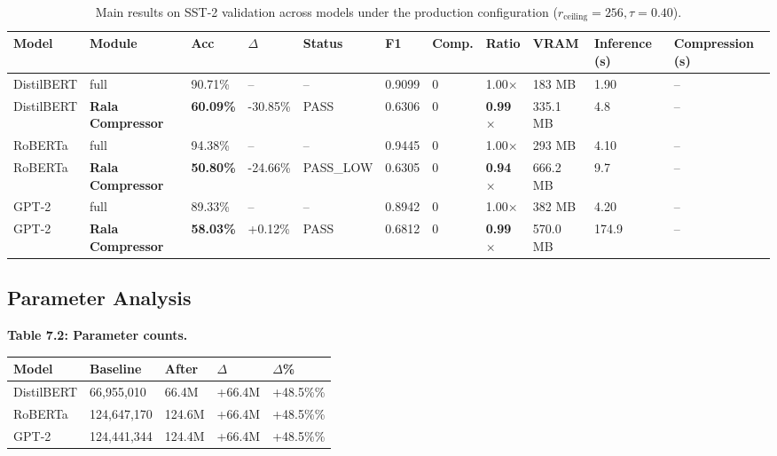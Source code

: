 \begin{table}[t]
\centering
\small
\begin{tabular}{lllllllllll}
\toprule
\textbf{Model} & \textbf{Module} & \textbf{Acc} & \textbf{$\Delta$} & \textbf{Status} & \textbf{F1} & \textbf{Comp.} & \textbf{Ratio} & \textbf{VRAM} & \textbf{Inference (s)} & \textbf{Compression (s)} \\
\midrule
DistilBERT & full & 90.71\% & -- & -- & 0.9099 & 0 & 1.00$\times$ & 183 MB & 1.90 & -- \\
DistilBERT & \textbf{Rala Compressor} & \textbf{60.09\%} & -30.85\% & PASS & 0.6306 & 0 & \textbf{0.99$\times$} & 335.1 MB & 4.8 & -- \\
RoBERTa & full & 94.38\% & -- & -- & 0.9445 & 0 & 1.00$\times$ & 293 MB & 4.10 & -- \\
RoBERTa & \textbf{Rala Compressor} & \textbf{50.80\%} & -24.66\% & PASS\_LOW & 0.6305 & 0 & \textbf{0.94$\times$} & 666.2 MB & 9.7 & -- \\
GPT-2 & full & 89.33\% & -- & -- & 0.8942 & 0 & 1.00$\times$ & 382 MB & 4.20 & -- \\
GPT-2 & \textbf{Rala Compressor} & \textbf{58.03\%} & +0.12\% & PASS & 0.6812 & 0 & \textbf{0.99$\times$} & 570.0 MB & 174.9 & -- \\
\bottomrule
\end{tabular}
\caption{Main results on SST-2 validation across models under the production configuration ($r_{\mathrm{ceiling}}=256, \tau=0.40$).}
\label{tab:main_sst2}
\end{table}

\subsection{Parameter Analysis}

\textbf{Table 7.2: Parameter counts.}

\begin{table}[H]
\centering
\small
\begin{tabular}{lllll}
\toprule
\textbf{Model} & \textbf{Baseline} & \textbf{After} & \textbf{$\Delta$} & \textbf{$\Delta$\%} \\
\midrule
DistilBERT & 66,955,010 & 66.4M & +66.4M & +48.5\%\% \\
RoBERTa & 124,647,170 & 124.6M & +66.4M & +48.5\%\% \\
GPT-2 & 124,441,344 & 124.4M & +66.4M & +48.5\%\% \\
\bottomrule
\end{tabular}
\end{table}

